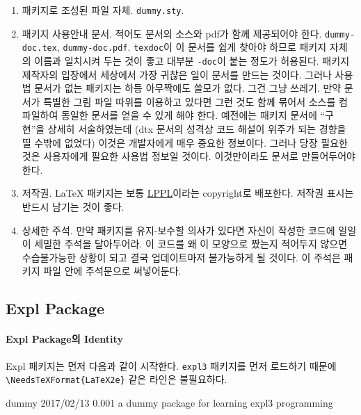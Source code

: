 \documentclass[a4paper,amsmath]{oblivoir}
\newcounter{sub}
\begin{document}
\begin{enumerate}[(1)] \firmlist
\item 패키지로 조성된 파일 자체. \verb|dummy.sty|.

\item 패키지 사용안내 문서. 적어도 문서의 소스와 pdf가 함께 제공되어야 한다. \verb|dummy-doc.tex|, \verb|dummy-doc.pdf|. \texttt{texdoc}이 이 문서를 쉽게 찾아야 하므로 패키지 자체의
이름과 일치시켜 두는 것이 좋고 대부분 \verb|-doc|이 붙는 정도가 허용된다. 패키지 제작자의 입장에서
세상에서 가장 귀찮은 일이 문서를 만드는 것이다. 그러나 사용법 문서가 없는 패키지는 하등 아무짝에도 쓸모가
없다. 그건 그냥 쓰레기. 만약 문서가 특별한 그림 파일 따위를 이용하고 있다면 그런 것도 함께 묶어서
소스를 컴파일하여 동일한 문서를 얻을 수 있게 해야 한다. 예전에는 패키지 문서에 “구현”을 상세히
서술하였는데 (dtx 문서의 성격상 코드 해설이 위주가 되는 경향을 띨 수밖에 없었다) 이것은 개발자에게 매우 중요한 정보이다. 그러나 당장 필요한 것은 사용자에게 필요한
사용법 정보일 것이다. 이것만이라도 문서로 만들어두어야 한다.

\item 저작권. \LaTeX{} 패키지는 보통 \href{https://www.latex-project.org/lppl/}{LPPL}이라는 copyright로 배포한다. 저작권 표시는 반드시 남기는 것이 좋다.

\item 상세한 주석. 만약 패키지를 유지-보수할 의사가 있다면 자신이 작성한 코드에 일일이 세밀한
주석을 달아두어라. 이 코드를 왜 이 모양으로 짰는지 적어두지 않으면 수습불가능한 상황이 되고
결국 업데이트마저 불가능하게 될 것이다. 이 주석은 패키지 파일 안에 주석문으로 써넣어둔다.
\end{enumerate}

\subsection{Expl Package}

\paragraph{Expl Package의 Identity}

Expl 패키지는 먼저 다음과 같이 시작한다. \verb|expl3| 패키지를
먼저 로드하기 때문에 \verb|\NeedsTeXFormat{LaTeX2e}| 같은 라인은 불필요하다.

\begin{exampleonly}
\RequirePackage{expl3}
\ProvidesExplPackage
    {dummy}
    {2017/02/13}
    {0.001}
    {a dummy package for learning expl3 programming}
\end{exampleonly}
\end{document}
